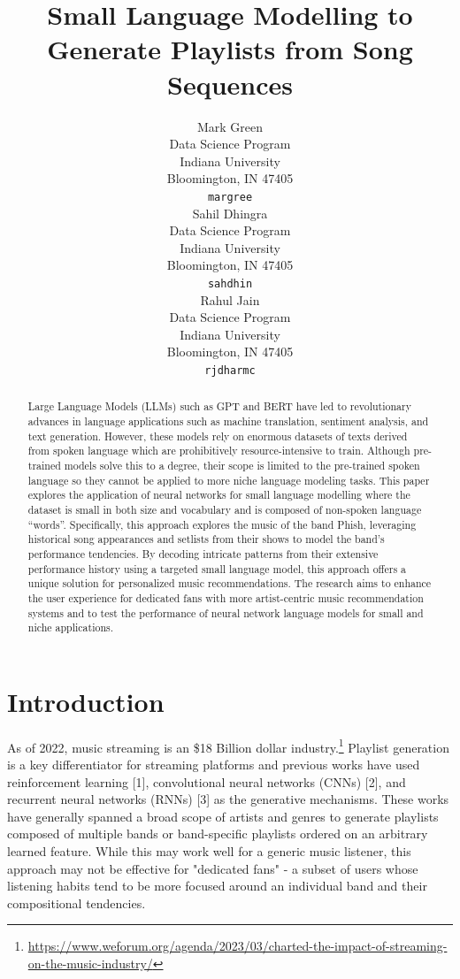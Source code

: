 \documentclass{article}
\title{Small Language Modelling to Generate Playlists from Song Sequences}
\author{
  Mark Green\\
  Data Science Program\\
  Indiana University\\
  Bloomington, IN 47405\\
  \texttt{margree}\\
  \And
  Sahil Dhingra \\
  Data Science Program\\
  Indiana University\\
  Bloomington, IN 47405\\
  \texttt{sahdhin}\\
  \And
  Rahul Jain \\
  Data Science Program\\
  Indiana University\\
  Bloomington, IN 47405\\
  \texttt{rjdharmc}\\
}
\begin{document}
\maketitle


\begin{abstract}
  Large Language Models (LLMs) such as GPT and BERT have led to revolutionary advances in language applications such as machine translation, sentiment analysis, and text generation. However, these models rely on enormous datasets of texts derived from spoken language which are prohibitively resource-intensive to train. Although pre-trained models solve this to a degree, their scope is limited to the pre-trained spoken language so they cannot be applied to more niche language modeling tasks. This paper explores the application of neural networks for small language modelling where the dataset is small in both size and vocabulary and is composed of non-spoken language “words”. Specifically, this approach explores the music of the band Phish, leveraging historical song appearances and setlists from their shows to model the band's performance tendencies. By decoding intricate patterns from their extensive performance history using a targeted small language model, this approach offers a unique solution for personalized music recommendations. The research aims to enhance the user experience for dedicated fans with more artist-centric music recommendation systems and to test the performance of neural network language models for small and niche applications.
\end{abstract}

\section{Introduction}

As of 2022, music streaming is an \$18 Billion dollar industry.\footnote{\url{https://www.weforum.org/agenda/2023/03/charted-the-impact-of-streaming-on-the-music-industry/}} Playlist generation is a key differentiator for streaming platforms and previous works have used reinforcement learning [1], convolutional neural networks (CNNs) [2], and recurrent neural networks (RNNs) [3] as the generative mechanisms. These works have generally spanned a broad scope of artists and genres to generate playlists composed of multiple bands or band-specific playlists ordered on an arbitrary learned feature. While this may work well for a generic music listener, this approach may not be effective for "dedicated fans" - a subset of users whose listening habits tend to be more focused around an individual band and their compositional tendencies. 
\end{document}
